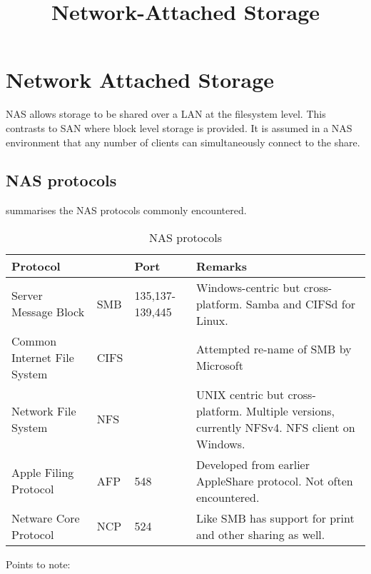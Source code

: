 \documentclass[slides]{pgnotes}
\title{Network-Attached Storage}
\begin{document}
\maketitle

\tableofcontents

\section{Network Attached Storage}\label{network-attached-storage}

NAS allows storage to be shared over a LAN at the filesystem level. This
contrasts to SAN where block level storage is provided. It is assumed in
a NAS environment that any number of clients can simultaneously connect
to the share.

\subsection{NAS protocols}
\label{sec:nas-protocols}

summarises the NAS protocols commonly encountered.

\begin{table}[htbp]
  \begin{tabularx}{1.0\linewidth}{l l l X}
    \toprule
    \textbf{Protocol} & ~ & \textbf{Port} & \textbf{Remarks} \\
    \midrule
    Server Message Block & SMB & 135,137-139,445 & Windows-centric but cross-platform. Samba and CIFSd for Linux.\\
    Common Internet File System & CIFS & ~ & Attempted re-name of SMB by Microsoft\\
    Network File System & NFS & ~ & UNIX centric but cross-platform. Multiple versions, currently NFSv4. NFS client on Windows.\\
    Apple Filing Protocol & AFP & 548 & Developed from earlier AppleShare protocol. Not often encountered.\\
    Netware Core Protocol & NCP & 524 & Like SMB has support for print and other sharing as well.\\
    \bottomrule
  \end{tabularx}
  \caption{NAS protocols}
  \label{tab:nas-protocols}
\end{table}

Points to note:
\end{document}
